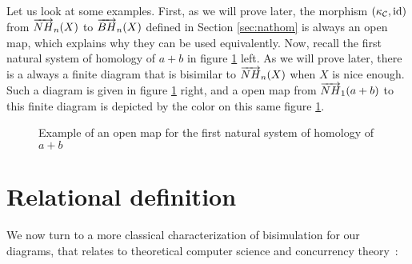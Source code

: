 	
	
Let us look at some examples. First, as we will prove later, the morphism $(\kappa_{\mathcal{C}},\text{id})$ from $\overrightarrow{NH}_{n}(X)$ to $\overrightarrow{BH}_{n}(X)$ defined in Section \ref{sec:nathom} is always an open map, which explains why they can be used equivalently. Now, recall the first natural system of homology of $a+b$ in figure \ref{fig:bisexa} left. As we will prove later, there is a always a finite diagram that is bisimilar to $\overrightarrow{NH}_{n}(X)$ when $X$ is nice enough. Such a diagram is given in figure \ref{fig:bisexa} right, and a open map from $\overrightarrow{NH}_{1}(a+b)$ to this finite diagram is depicted by the color on this same figure \ref{fig:bisexa}.
		\begin{figure}[H]
			\begin{center}
    				
  			\end{center}
			\caption{Example of an open map for the first natural system of homology of $a+b$}
			\label{fig:bisexa}
		\end{figure}







\section{Relational definition}
\label{sec:reldefi}

We now turn to a more classical characterization of bisimulation for our diagrams, that relates to 
theoretical computer science and concurrency theory~: 

